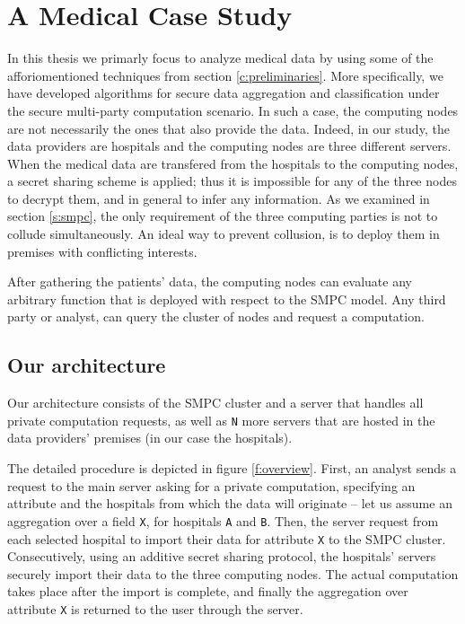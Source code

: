 \chapter{A Medical Case Study}\label{c:medical-study}

In this thesis we primarly focus to analyze medical data by using some of the afforiomentioned techniques from section \ref{c:preliminaries}.
More specifically, we have developed algorithms for secure data aggregation and classification under the secure multi-party computation scenario.
In such a case, the computing nodes are not necessarily the ones that also provide the data.
Indeed, in our study, the data providers are hospitals and the computing nodes are three different servers.
When the medical data are transfered from the hospitals to the computing nodes, a secret sharing scheme is applied; thus it is impossible for any of the three nodes to decrypt them, and in general to infer any information.
As we examined in section \ref{s:smpc}, the only requirement of the three computing parties is not to collude simultaneously.
An ideal way to prevent collusion, is to deploy them in premises with conflicting interests.


After gathering the patients' data, the computing nodes can evaluate any arbitrary function that is deployed with respect to the SMPC model.
Any third party or analyst, can query the cluster of nodes and request a computation.


\section{Our architecture }\label{s:architecture}
Our architecture consists of the SMPC cluster and a server  that handles all private computation requests, as well as \texttt{N} more servers that are hosted in the data providers' premises (in our case the hospitals).


The detailed procedure is depicted in figure \ref{f:overview}.
First, an analyst sends a request to the main server asking for a private computation, specifying an attribute and the hospitals from which the data will originate -- let us assume an aggregation over a field \texttt{X}, for hospitals \texttt{A} and \texttt{B}.
Then, the server request from each selected hospital to import their data for attribute \texttt{X} to the SMPC cluster.
Consecutively, using an additive secret sharing protocol, the hospitals' servers securely import their data to the three computing nodes.
The actual computation takes place after the import is complete, and finally the aggregation over attribute \texttt{X} is returned to the user through the server.



